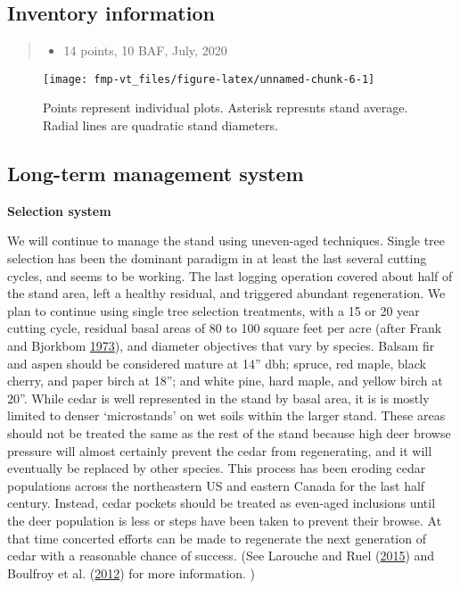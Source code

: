 \documentclass[]{tufte-handout}
\providecommand{\tightlist}{%
  \setlength{\itemsep}{0pt}\setlength{\parskip}{0pt}}
\begin{document}
\subsection{Inventory information}\label{inventory-information}

\begin{quote}
\begin{itemize}
\tightlist
\item
  14 points, 10 BAF, July, 2020
\end{itemize}
\end{quote}

\begin{figure}
\texttt{[image: fmp-vt\_files/figure-latex/unnamed-chunk-6-1]} \caption[Points represent individual plots]{Points represent individual plots. Asterisk represnts stand average. Radial lines are quadratic stand diameters.}\label{fig:unnamed-chunk-6}
\end{figure}

\subsection{Long-term management
system}\label{long-term-management-system}

\textbf{Selection system}

We will continue to manage the stand using uneven-aged techniques.
Single tree selection has been the dominant paradigm in at least the
last several cutting cycles, and seems to be working. The last logging
operation covered about half of the stand area, left a healthy residual,
and triggered abundant regeneration. We plan to continue using single
tree selection treatments, with a 15 or 20 year cutting cycle, residual
basal areas of 80 to 100 square feet per acre (after Frank and Bjorkbom
\protect\hyperlink{ref-frank_silvicultural_1973}{1973}), and diameter
objectives that vary by species. Balsam fir and aspen should be
considered mature at 14'' dbh; spruce, red maple, black cherry, and
paper birch at 18''; and white pine, hard maple, and yellow birch at
20''. While cedar is well represented in the stand by basal area, it is
is mostly limited to denser `microstands' on wet soils within the larger
stand. These areas should not be treated the same as the rest of the
stand because high deer browse pressure will almost certainly prevent
the cedar from regenerating, and it will eventually be replaced by other
species. This process has been eroding cedar populations across the
northeastern US and eastern Canada for the last half century. Instead,
cedar pockets should be treated as even-aged inclusions until the deer
population is less or steps have been taken to prevent their browse. At
that time concerted efforts can be made to regenerate the next
generation of cedar with a reasonable chance of success. (See Larouche
and Ruel (\protect\hyperlink{ref-larouche_development_2015}{2015}) and
Boulfroy et al.
(\protect\hyperlink{ref-boulfroy_silvicultural_2012}{2012}) for more
information. )
\end{document}
